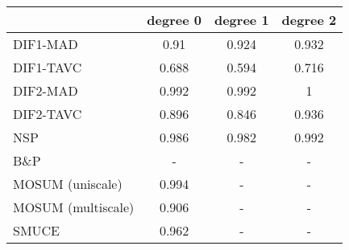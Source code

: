 \begin{tabular}{|l|c|c|c|}
  \hline
 & degree 0 & degree 1 & degree 2 \\ 
  \hline
DIF1-MAD & 0.91 & 0.924 & 0.932 \\ 
  DIF1-TAVC & 0.688 & 0.594 & 0.716 \\ 
  DIF2-MAD & 0.992 & 0.992 & 1 \\ 
  DIF2-TAVC & 0.896 & 0.846 & 0.936 \\ 
  NSP & 0.986 & 0.982 & 0.992 \\ 
  B\&P & - & - & - \\ 
  MOSUM (uniscale) & 0.994 & - & - \\ 
  MOSUM (multiscale) & 0.906 & - & - \\ 
  SMUCE & 0.962 & - & - \\ 
   \hline
\end{tabular}
